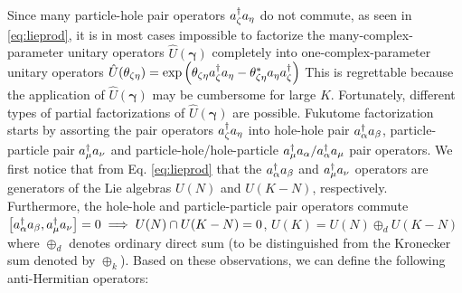 \documentclass{aux/ttuthes2007}
\newcommand{\paren}[1]{\left( #1 \right)}
\newcommand{\elec}{N}
\newcommand{\orb}{K}
\newcommand{\anio}[1]{a_{\oo{#1}}}
\newcommand{\aniu}[1]{a_{\uo{#1}}}
\newcommand{\anig}[1]{a_{\go{#1}}}
\newcommand{\creo}[1]{a^\dagger_{\oo{#1}}}
\newcommand{\creu}[1]{a^\dagger_{\uo{#1}}}
\newcommand{\creg}[1]{a^\dagger_{\go{#1}}}
\newcommand{\uo}[1]{
		\IfEqCase{#1}{
			{0}{\mu}
			{1}{\nu}
			{2}{\xi}
		}[\PackageError{uo}{Undefined option to uo: #1}{}]
}
\newcommand{\oo}[1]{
		\IfEqCase{#1}{
			{0}{\alpha}
			{1}{\beta}
			{2}{\gamma}
		}[\PackageError{unocorb}{Undefined option to unuo: #1}{}]
}
\newcommand{\go}[1]{
		\IfEqCase{#1}{
			{0}{\zeta}
			{1}{\eta}
			{2}{\iota}
			{3}{\kappa}
		}[\PackageError{unocorb}{Undefined option to go: #1}{}]
}
\begin{document}
Since many particle-hole pair operators $\creg 0 \anig 1$ do not commute, as seen in \ref{eq:lieprod}, it is in most cases impossible to factorize the many-complex-parameter unitary operators $\hat U(\bm \gamma)$ completely into one-complex-parameter unitary operators 
$\hat U(\theta_{\go 0 \go 1}) = \exp\paren{\theta_{\go 0 \go 1}\creg 0 \anig 1 - \theta_{\go 0 \go 1}^*\anig 1 \creg 0}$
This is regrettable because the application of $\hat U(\bm \gamma)$ may be cumbersome for large $\orb$.
Fortunately, different types of partial factorizations of $\hat U(\bm \gamma)$ are possible.
Fukutome factorization starts by assorting the pair operators $\creg 0 \anig 1$ into hole-hole pair $\creo 0 \anio 1$, particle-particle pair $\creu 0 \aniu 1$ and particle-hole/hole-particle $\creu 0 \anio 0 / \creo 0 \aniu 0$ pair operators. 
We first notice that from Eq. \ref{eq:lieprod} that the $\creo 0 \anio 1$ and $\creu 0 \aniu 1$
operators are generators of the Lie algebras $U( \elec )$ and $U ( \orb - \elec )$, respectively. Furthermore, the
hole-hole and particle-particle pair operators commute $\left[\creo 0 \anio 1, \creu 0 \aniu 1\right] = 0 \implies {U(\elec) \cap U(\orb - \elec) = 0}$, ${U(\orb) = U(\elec)\oplus_d U(\orb - \elec)} $ where $\oplus_d$ denotes ordinary direct sum (to be distinguished from the Kronecker sum denoted by $\oplus_k$). Based on these observations, we can define the following anti-Hermitian operators:
\end{document}
